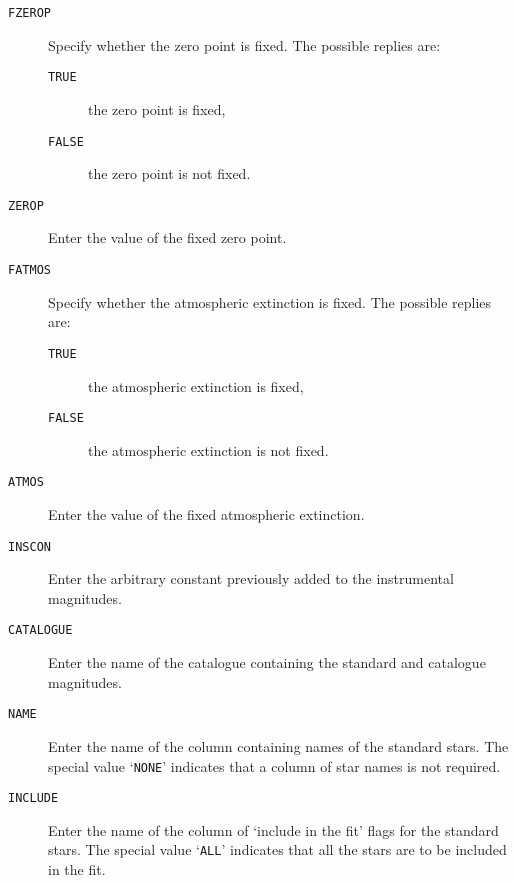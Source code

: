 \documentclass[twoside,11pt]{article}
\renewcommand{\_}{\texttt{\symbol{95}}}
\begin{document}
\begin{description}

  \item[ {\tt FZEROP} ] Specify whether the zero point is fixed.  The
   possible replies are:

  \begin{description}

    \item[ {\tt TRUE} ] the zero point is fixed,

    \item[ {\tt FALSE} ] the zero point is not fixed.

  \end{description}

  \item[ {\tt ZEROP} ] Enter the value of the fixed zero point.

  \item[ {\tt FATMOS} ] Specify whether the atmospheric extinction is
   fixed.  The possible replies are:

  \begin{description}

    \item[ {\tt TRUE} ] the atmospheric extinction is fixed,

    \item[ {\tt FALSE} ] the atmospheric extinction is not fixed.

  \end{description}

  \item[ {\tt ATMOS} ] Enter the value of the fixed atmospheric
   extinction.

  \item[ {\tt INSCON} ] Enter the arbitrary constant previously added
   to the instrumental magnitudes.

  \item[ {\tt CATALOGUE} ] Enter the name of the catalogue containing
   the standard and catalogue magnitudes.

  \item[ {\tt NAME} ] Enter the name of the column containing names of
   the standard stars.  The special value `{\tt NONE}' indicates that a
   column of star names is not required.

  \item[ {\tt INCLUDE} ] Enter the name of the column of `include in the
   fit' flags for the standard stars.  The special value `{\tt ALL}'
   indicates that all the stars are to be included in the fit.


\end{description}
\end{document}
